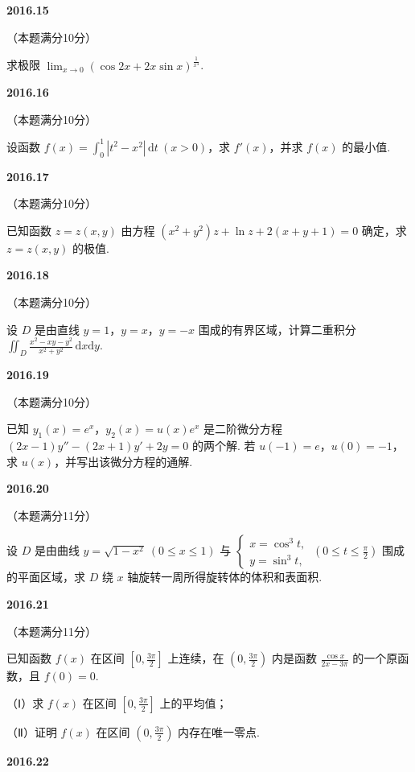 \documentclass[UTF8,12pt,fontset=windows]{ctexart}
\begin{document}
\vfill
\newpage
{\large\bfseries 2016.15}

（本题满分10分）

求极限 $\lim_{x \to 0} (\cos 2x + 2x\sin x)^{\frac{1}{x^4}}$.

\vfill
\newpage
{\large\bfseries 2016.16}

（本题满分10分）

设函数 $f(x) = \int_0^1 |t^2 - x^2|\,\mathrm{d}t \ (x > 0)$，求 $f'(x)$，并求 $f(x)$ 的最小值.

\vfill
\newpage
{\large\bfseries 2016.17}

（本题满分10分）

已知函数 $z = z(x, y)$ 由方程 $(x^2 + y^2)z + \ln z + 2(x + y + 1) = 0$ 确定，求 $z = z(x, y)$ 的极值.

\vfill
\newpage
{\large\bfseries 2016.18}

（本题满分10分）

设 $D$ 是由直线 $y = 1$，$y = x$，$y = -x$ 围成的有界区域，计算二重积分 $\iint_D \frac{x^2 - xy - y^2}{x^2 + y^2}\,\mathrm{d}x\mathrm{d}y$.

\vfill
\newpage
{\large\bfseries 2016.19}

（本题满分10分）

已知 $y_1(x) = e^x$，$y_2(x) = u(x)e^x$ 是二阶微分方程 $(2x - 1)y'' - (2x + 1)y' + 2y = 0$ 的两个解. 若 $u(-1) = e$，$u(0) = -1$，求 $u(x)$，并写出该微分方程的通解.

\vfill
\newpage
{\large\bfseries 2016.20}

（本题满分11分）

设 $D$ 是由曲线 $y = \sqrt{1 - x^2} \ (0 \leqslant x \leqslant 1)$ 与 $\begin{cases} x = \cos^3 t, \\ y = \sin^3 t, \end{cases} \ \left(0 \leqslant t \leqslant \frac{\pi}{2}\right)$ 围成的平面区域，求 $D$ 绕 $x$ 轴旋转一周所得旋转体的体积和表面积.

\vfill
\newpage
{\large\bfseries 2016.21}

（本题满分11分）

已知函数 $f(x)$ 在区间 $\left[0, \frac{3\pi}{2}\right]$ 上连续，在 $\left(0, \frac{3\pi}{2}\right)$ 内是函数 $\frac{\cos x}{2x - 3\pi}$ 的一个原函数，且 $f(0) = 0$.

（Ⅰ）求 $f(x)$ 在区间 $\left[0, \frac{3\pi}{2}\right]$ 上的平均值；

（Ⅱ）证明 $f(x)$ 在区间 $\left(0, \frac{3\pi}{2}\right)$ 内存在唯一零点.

\vfill
\newpage
{\large\bfseries 2016.22}
\end{document}
